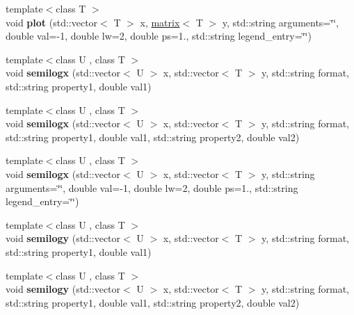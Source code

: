 \begin{DoxyCompactItemize}
\item 
\hypertarget{classkeycpp_1_1_figure_a61695cfaa39e175e95d6f8dca2184cbf}{{\footnotesize template$<$class T $>$ }\\void {\bfseries plot} (std\-::vector$<$ T $>$ x, \hyperlink{classkeycpp_1_1matrix}{matrix}$<$ T $>$ y, std\-::string arguments=\char`\"{}\char`\"{}, double val=-\/1, double lw=2, double ps=1., std\-::string legend\-\_\-entry=\char`\"{}\char`\"{})}\label{classkeycpp_1_1_figure_a61695cfaa39e175e95d6f8dca2184cbf}

\item 
\hypertarget{classkeycpp_1_1_figure_aa92130b35ce5dd9bc52e1ed4bd85682c}{{\footnotesize template$<$class U , class T $>$ }\\void {\bfseries semilogx} (std\-::vector$<$ U $>$ x, std\-::vector$<$ T $>$ y, std\-::string format, std\-::string property1, double val1)}\label{classkeycpp_1_1_figure_aa92130b35ce5dd9bc52e1ed4bd85682c}

\item 
\hypertarget{classkeycpp_1_1_figure_a442655002324395b08e5511bbb02146a}{{\footnotesize template$<$class U , class T $>$ }\\void {\bfseries semilogx} (std\-::vector$<$ U $>$ x, std\-::vector$<$ T $>$ y, std\-::string format, std\-::string property1, double val1, std\-::string property2, double val2)}\label{classkeycpp_1_1_figure_a442655002324395b08e5511bbb02146a}

\item 
\hypertarget{classkeycpp_1_1_figure_a849fa48f8fb7d4ee9cb205a5310f2c23}{{\footnotesize template$<$class U , class T $>$ }\\void {\bfseries semilogx} (std\-::vector$<$ U $>$ x, std\-::vector$<$ T $>$ y, std\-::string arguments=\char`\"{}\char`\"{}, double val=-\/1, double lw=2, double ps=1., std\-::string legend\-\_\-entry=\char`\"{}\char`\"{})}\label{classkeycpp_1_1_figure_a849fa48f8fb7d4ee9cb205a5310f2c23}

\item 
\hypertarget{classkeycpp_1_1_figure_a8fa3aba0daf6f74bbb7c1d0553156b44}{{\footnotesize template$<$class U , class T $>$ }\\void {\bfseries semilogy} (std\-::vector$<$ U $>$ x, std\-::vector$<$ T $>$ y, std\-::string format, std\-::string property1, double val1)}\label{classkeycpp_1_1_figure_a8fa3aba0daf6f74bbb7c1d0553156b44}

\item 
\hypertarget{classkeycpp_1_1_figure_a15fbce90514b55af60d3819c8da2561f}{{\footnotesize template$<$class U , class T $>$ }\\void {\bfseries semilogy} (std\-::vector$<$ U $>$ x, std\-::vector$<$ T $>$ y, std\-::string format, std\-::string property1, double val1, std\-::string property2, double val2)}\label{classkeycpp_1_1_figure_a15fbce90514b55af60d3819c8da2561f}


\end{DoxyCompactItemize}
